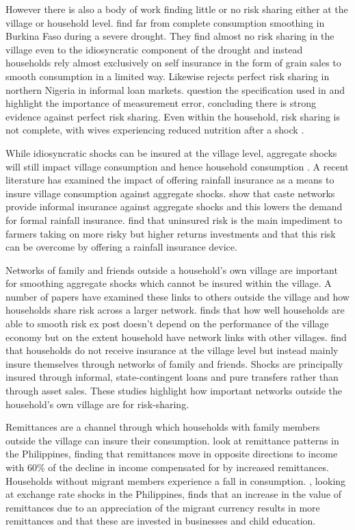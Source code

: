 However there is also a body of work finding little or no risk sharing either at the village or household level. \cite{kaziangaudry2006} find far from complete consumption smoothing in Burkina Faso during a severe drought. They find almost no risk sharing in the village even to the idiosyncratic component of the drought and instead households rely almost exclusively on self insurance in the form of grain sales to smooth consumption in a limited way. Likewise \cite{udry1994} rejects perfect risk sharing in northern Nigeria in informal loan markets. \cite{ravallion1997risk} question the specification used in \cite{Townsend1994} and highlight the importance of measurement error, concluding there is strong evidence against perfect risk sharing. Even within the household, risk sharing is not complete, with wives experiencing reduced nutrition after a shock \citep{derconkrishnan2000}.

While idiosyncratic shocks can be insured at the village level, aggregate shocks will still impact village consumption and hence household consumption \citep{mace1991full}. A recent literature has examined the impact of offering rainfall insurance as a means to insure village consumption against aggregate shocks. \cite{mobarakrosenzweig2012} show that caste networks provide informal insurance against aggregate shocks and this lowers the demand for formal rainfall insurance. \cite{karlanudry2012} find that uninsured risk is the main impediment to farmers taking on more risky but higher returns investments and that this risk can be overcome by offering a rainfall insurance device.  

Networks of family and friends outside a household's own village are important for smoothing aggregate shocks which cannot be insured within the village. A number of papers have examined these links to others outside the village and how households share risk across a larger network. \cite{rosenzweig1988} finds that how well households are able to smooth risk ex post doesn't depend on the performance of the village economy but on the extent household have network links with other villages. \cite{fafchampslund2003} find that households do not receive insurance at the village level but instead mainly insure themselves through networks of family and friends. Shocks are principally insured through informal, state-contingent loans and pure transfers rather than through asset sales. These studies highlight how important networks outside the household's own village are for risk-sharing. 

Remittances are a channel through which households with family members outside the village can insure their consumption. \cite{yangchoi2007} look at remittance patterns in the Philippines, finding that remittances move in opposite directions to income with 60\% of the decline in income compensated for by increased remittances. Households without migrant members experience a fall in consumption.  \cite{yang2008}, looking at exchange rate shocks in the Philippines, finds that an increase in the value of remittances due to an appreciation of the migrant currency results in more remittances and that these are invested in businesses and child education.  

